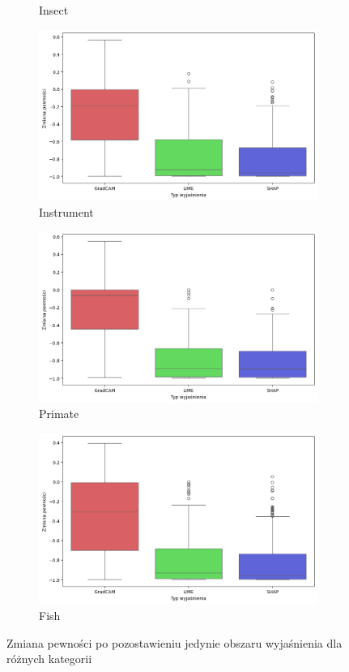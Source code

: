 \begin{figure}[h]
\begin{subfigure}[b]{0.3\textwidth}
		\caption{Insect}  \label{rys:base_confidence_exp_insect}
	\end{subfigure}
	\begin{subfigure}[b]{0.3\textwidth}
		\centering\includegraphics[width=.9\textwidth]{img/base_confidence_exp_music}
		\caption{Instrument}  \label{rys:base_confidence_exp_music}
	\end{subfigure}
	\begin{subfigure}[b]{0.3\textwidth}
		\centering\includegraphics[width=.9\textwidth]{img/base_confidence_exp_primate}
		\caption{Primate}  \label{rys:base_confidence_exp_primate}
	\end{subfigure}
	\begin{subfigure}[b]{0.3\textwidth}
		\centering\includegraphics[width=.9\textwidth]{img/base_confidence_exp_fish}
		\caption{Fish}  \label{rys:base_confidence_exp_fish}
	\end{subfigure}
	\caption{Zmiana pewności po pozostawieniu jedynie obszaru wyjaśnienia dla różnych kategorii}
	\label{rys:base_confidence_exp_category}
\end{figure}


